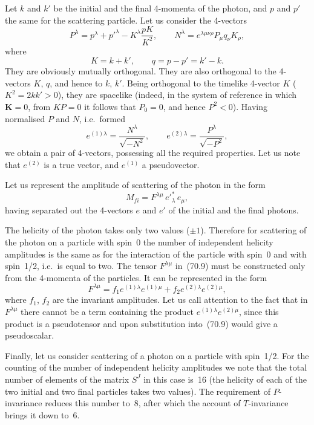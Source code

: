 Let $k$ and $k'$ be the initial and the final 4-momenta of the photon, and $p$ and $p'$ the same for the scattering particle. Let us consider the 4-vectors
\begin{equation}
P^\lambda = p^\lambda + p'^\lambda - K^\lambda\frac{pK}{K^2},\qquad N^\lambda = e^{\lambda\mu\nu\rho}P_\mu q_\nu K_\rho,
\tag{70.7}
\end{equation}
where
\[
K = k + k',\qquad q = p - p' = k' - k.
\]
They are obviously mutually orthogonal. They are also orthogonal to the 4-vectors $K$, $q$, and hence to $k$, $k'$. Being orthogonal to the timelike 4-vector $K$ ($K^2 = 2kk' > 0$), they are spacelike (indeed, in the system of reference in which $\mathbf{K} = 0$, from $KP = 0$ it follows that $P_0 = 0$, and hence $P^2 < 0$). Having normalised $P$ and $N$, i.e.\ formed
\begin{equation}
e^{(1)\lambda} = \frac{N^\lambda}{\sqrt{-N^2}},\qquad e^{(2)\lambda} = \frac{P^\lambda}{\sqrt{-P^2}},
\tag{70.8}
\end{equation}
we obtain a pair of 4-vectors, possessing all the required properties. Let us note that $e^{(2)}$ is a true vector, and $e^{(1)}$ a pseudovector.

Let us represent the amplitude of scattering of the photon in the form
\begin{equation}
M_{fi} = F^{\lambda\mu}\,e'^*_\lambda\,e_\mu,
\tag{70.9}
\end{equation}
having separated out the 4-vectors $e$ and $e'$ of the initial and the final photons.

The helicity of the photon takes only two values ($\pm 1$). Therefore for scattering of the photon on a particle with spin~0 the number of independent helicity amplitudes is the same as for the interaction of the particle with spin~0 and with spin~1/2, i.e.\ is equal to two. The tensor $F^{\lambda\mu}$ in~(70.9) must be constructed only from the 4-momenta of the particles. It can be represented in the form
\begin{equation}
F^{\lambda\mu} = f_1 e^{(1)\lambda}e^{(1)\mu} + f_2 e^{(2)\lambda}e^{(2)\mu},
\tag{70.10}
\end{equation}
where $f_1$, $f_2$ are the invariant amplitudes. Let us call attention to the fact that in $F^{\lambda\mu}$ there cannot be a term containing the product $e^{(1)\lambda}e^{(2)\mu}$, since this product is a pseudotensor and upon substitution into~(70.9) would give a pseudoscalar.

Finally, let us consider scattering of a photon on a particle with spin~1/2. For the counting of the number of independent helicity amplitudes we note that the total number of elements of the matrix $S^J$ in this case is~16 (the helicity of each of the two initial and two final particles takes two values). The requirement of $P$-invariance reduces this number to~8, after which the account of $T$-invariance brings it down to~6.


